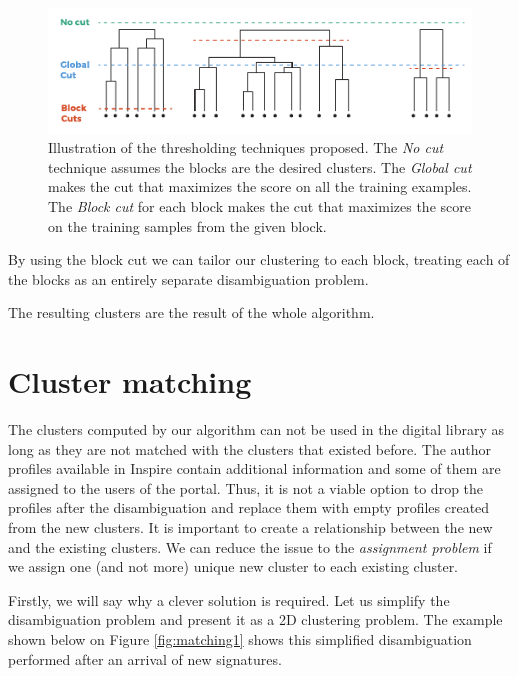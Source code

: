 \documentclass{pracamgr}
\begin{document}
\begin{figure}[th!]
\includegraphics[width=\textwidth]{figures/fig-cuts}
\caption{Illustration of the thresholding techniques proposed. The \textit{No cut}
technique assumes the blocks are the desired clusters. The \textit{Global cut}
makes the cut that maximizes the score on all the training examples. The
\textit{Block cut} for each block makes the cut that maximizes the score
on the training samples from the given block.}
\label{fig:cuts}
\end{figure}


By using the block cut we can tailor our clustering to each block, treating
each of the blocks as an entirely separate disambiguation problem.

The resulting clusters are the result of the whole algorithm.


\chapter{Cluster matching}\label{sec:clustermatch}
The clusters computed by our algorithm can not be used in the digital library as long as
they are not matched with the clusters that existed before. The author profiles
available in Inspire contain additional information and some of them are assigned
to the users of the portal. Thus, it is not a viable option to drop the profiles
after the disambiguation and replace them with empty profiles created from the new
clusters. It is important to create a relationship between the new and the existing clusters.
We can reduce the issue to the \textit{assignment problem} if we assign one (and not
more) unique new cluster to each existing cluster.

Firstly, we will say why a clever solution is required. Let us simplify the
disambiguation problem and present it as a 2D clustering problem. The example
shown below on Figure \ref{fig:matching1} shows this simplified disambiguation performed
after an arrival of new signatures.
\\
\\
\\
\\
\\
\end{document}
